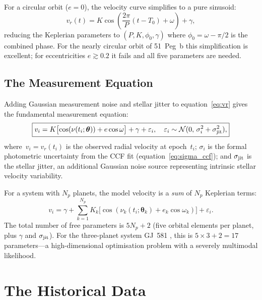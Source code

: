 \documentclass[12pt]{article}
\begin{document}
For a circular orbit ($e = 0$), the velocity curve simplifies to a
pure sinusoid:
\begin{equation}\label{eq:vr_circular}
  v_r(t) = K\cos\left(\frac{2\pi}{P}(t-T_0) + \omega\right) + \gamma,
\end{equation}
reducing the Keplerian parameters to $(P, K, \phi_0, \gamma)$ where
$\phi_0 = \omega - \pi/2$ is the combined phase.  For the nearly
circular orbit of 51~Peg~b this simplification is excellent; for
eccentricities $e \gtrsim 0.2$ it fails and all five parameters are
needed.

\subsection{The Measurement Equation}

Adding Gaussian measurement noise and stellar jitter to
equation~\eqref{eq:vr} gives the fundamental measurement equation:
\begin{equation}\label{eq:meas}
  \boxed{v_i = K\bigl[\cos(\nu(t_i;\boldsymbol\theta)) + e\cos\omega\bigr]
    + \gamma + \varepsilon_i,
    \quad
    \varepsilon_i \sim \mathcal{N}(0,\,\sigma_i^2 + \sigma_{\rm jit}^2),}
\end{equation}
where~$v_i = v_r(t_i)$ is the observed radial velocity at epoch~$t_i$;
$\sigma_i$ is the formal photometric uncertainty from the CCF fit
(equation~\ref{eq:sigma_ccf}); and $\sigma_{\rm jit}$ is the stellar
jitter, an additional Gaussian noise source representing intrinsic
stellar velocity variability.

For a system with $N_p$ planets, the model velocity is a
\emph{sum} of $N_p$ Keplerian terms:
\begin{equation}\label{eq:meas_Np}
  v_i = \gamma + \sum_{k=1}^{N_p}
    K_k\bigl[\cos(\nu_k(t_i;\boldsymbol\theta_k) + e_k\cos\omega_k)\bigr]
    + \varepsilon_i.
\end{equation}
The total number of free parameters is $5N_p + 2$ (five orbital elements
per planet, plus $\gamma$ and $\sigma_{\rm jit}$).  For the
three-planet system GJ~581 \citep{UdryBonfils2007}, this is
$5\times3 + 2 = 17$ parameters---a high-dimensional optimisation problem
with a severely multimodal likelihood.

\section{The Historical Data}
\label{sec:data}
\end{document}
